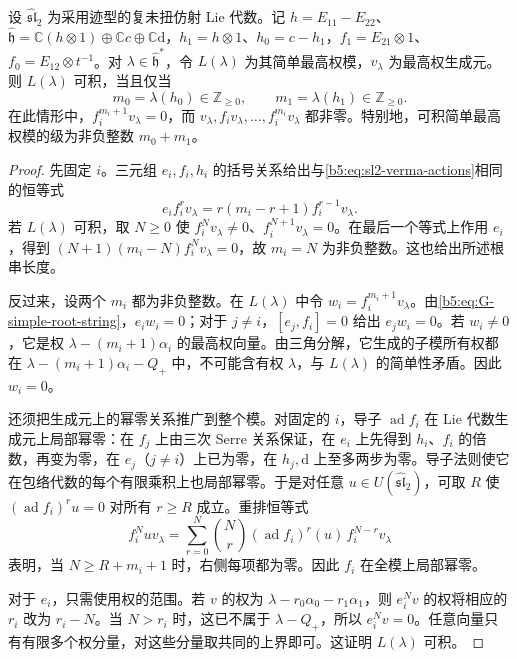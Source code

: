\begin{theorem}\label{b5:thm:G-affine-integrable}
	设 \(\widehat{\mathfrak{sl}}_2\) 为采用迹型的复未扭仿射 Lie 代数。记 \(h=E_{11}-E_{22}\)、\(\widehat{\mathfrak h}=\mathbb C(h\otimes1)\oplus\mathbb Cc\oplus\mathbb C\mathrm d\)，\(h_1=h\otimes1\)、\(h_0=c-h_1\)，\(f_1=E_{21}\otimes1\)、\(f_0=E_{12}\otimes t^{-1}\)。对 \(\lambda\in\widehat{\mathfrak h}^*\)，令 \(L(\lambda)\) 为其简单最高权模，\(v_\lambda\) 为最高权生成元。则 \(L(\lambda)\) 可积，当且仅当
	\[
		m_0=\lambda(h_0)\in\mathbb Z_{\ge0},\qquad
		m_1=\lambda(h_1)\in\mathbb Z_{\ge0}.
	\]
	在此情形中，\(f_i^{m_i+1}v_\lambda=0\)，而 \(v_\lambda,f_iv_\lambda,\ldots,f_i^{m_i}v_\lambda\) 都非零。特别地，可积简单最高权模的级为非负整数 \(m_0+m_1\)。
\end{theorem}
\begin{proof}
	先固定 \(i\)。三元组 \(e_i,f_i,h_i\) 的括号关系给出与\eqref{b5:eq:sl2-verma-actions}相同的恒等式
	\begin{equation}\label{b5:eq:G-simple-root-string}
		e_i f_i^r v_\lambda=r(m_i-r+1)f_i^{r-1}v_\lambda.
	\end{equation}
	若 \(L(\lambda)\) 可积，取 \(N\ge0\) 使 \(f_i^Nv_\lambda\ne0\)、\(f_i^{N+1}v_\lambda=0\)。在最后一个等式上作用 \(e_i\)，得到 \((N+1)(m_i-N)f_i^Nv_\lambda=0\)，故 \(m_i=N\) 为非负整数。这也给出所述根串长度。

	反过来，设两个 \(m_i\) 都为非负整数。在 \(L(\lambda)\) 中令 \(w_i=f_i^{m_i+1}v_\lambda\)。由\eqref{b5:eq:G-simple-root-string}，\(e_iw_i=0\)；对于 \(j\ne i\)，\([e_j,f_i]=0\) 给出 \(e_jw_i=0\)。若 \(w_i\ne0\)，它是权 \(\lambda-(m_i+1)\alpha_i\) 的最高权向量。由三角分解，它生成的子模所有权都在 \(\lambda-(m_i+1)\alpha_i-Q_+\) 中，不可能含有权 \(\lambda\)，与 \(L(\lambda)\) 的简单性矛盾。因此 \(w_i=0\)。

	还须把生成元上的幂零关系推广到整个模。对固定的 \(i\)，导子 \(\operatorname{ad}f_i\) 在 Lie 代数生成元上局部幂零：在 \(f_j\) 上由三次 Serre 关系保证，在 \(e_i\) 上先得到 \(h_i\)、\(f_i\) 的倍数，再变为零，在 \(e_j\)（\(j\ne i\)）上已为零，在 \(h_j,\mathrm d\) 上至多两步为零。导子法则使它在包络代数的每个有限乘积上也局部幂零。于是对任意 \(u\in U(\widehat{\mathfrak{sl}}_2)\)，可取 \(R\) 使 \((\operatorname{ad}f_i)^ru=0\) 对所有 \(r\ge R\) 成立。重排恒等式
	\[
		f_i^Nu v_\lambda
		=\sum_{r=0}^N\binom Nr
		(\operatorname{ad}f_i)^r(u)\,f_i^{N-r}v_\lambda
	\]
	表明，当 \(N\ge R+m_i+1\) 时，右侧每项都为零。因此 \(f_i\) 在全模上局部幂零。

	对于 \(e_i\)，只需使用权的范围。若 \(v\) 的权为 \(\lambda-r_0\alpha_0-r_1\alpha_1\)，则 \(e_i^Nv\) 的权将相应的 \(r_i\) 改为 \(r_i-N\)。当 \(N>r_i\) 时，这已不属于 \(\lambda-Q_+\)，所以 \(e_i^Nv=0\)。任意向量只有有限多个权分量，对这些分量取共同的上界即可。这证明 \(L(\lambda)\) 可积。
\end{proof}


